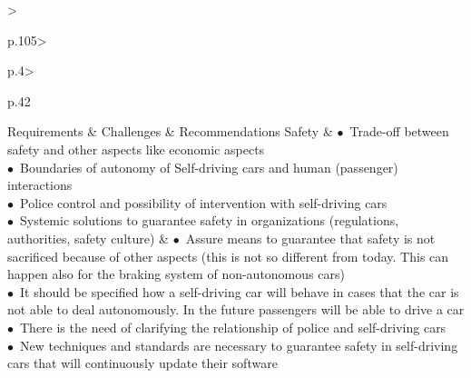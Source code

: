 \begin{table}[t]
	\centering
	\caption{Summary of the technical Challenges and Recommendations grouped by Requirements}
	\label{tab:Findings}
	\begin{small}
		\begin{supertabular}{%
		>{\raggedright}p{.105\textwidth}>{\raggedright}p{.4\textwidth}>{\raggedright}p{.42\textwidth}}
			\toprule
			 {Requirements} & {Challenges} & {Recommendations}  \tabularnewline
			\midrule
			Safety & 
					\noindent $\bullet$~Trade-off between safety and other aspects like economic aspects\\
					\noindent $\bullet$~Boundaries of autonomy of Self-driving cars and human (passenger) interactions\\
					\noindent $\bullet$~Police control and possibility of intervention with self-driving cars\\
					\noindent $\bullet$~Systemic solutions to guarantee safety in organizations (regulations, authorities, safety culture) 
 			& 
					\noindent $\bullet$~Assure means to guarantee that safety is not sacrificed because of other aspects (this is not so different from today. This can happen also for the braking system of non-autonomous cars)\\
					\noindent $\bullet$~It should be specified how a self-driving car will behave in cases that the car is not able to deal autonomously. In the future passengers will be able to drive a car \\
					\noindent $\bullet$~There is the need of clarifying the relationship of police and self-driving cars\\
					\noindent $\bullet$~New techniques and standards are necessary to guarantee safety in self-driving cars that will continuously update their software

\end{supertabular}
\end{small}
\end{table}
